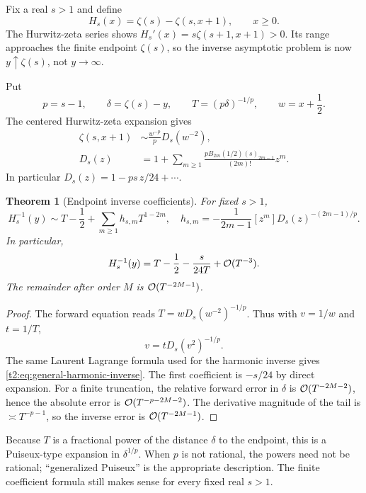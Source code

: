\documentclass[11pt,openany]{book}
\numberwithin{equation}{chapter}
\theoremstyle{plain}
\newtheorem{theorem}{Theorem}[chapter]
\theoremstyle{definition}
\theoremstyle{remark}
\newcommand{\rising}[2]{(#1)_{#2}}
\begin{document}
Fix a real $s>1$ and define
\begin{equation}
 H_s(x)=\zeta(s)-\zeta(s,x+1),\qquad x\ge0.
 \label{t2:eq:general-harmonic}
\end{equation}
The Hurwitz-zeta series shows
$H_s'(x)=s\zeta(s+1,x+1)>0$. Its range approaches the finite endpoint $\zeta(s)$, so the inverse asymptotic problem is now $y\uparrow\zeta(s)$, not $y\to\infty$.

Put
\begin{equation}
 p=s-1,\qquad \delta=\zeta(s)-y,\qquad
 T=(p\delta)^{-1/p},\qquad w=x+\frac12.
 \label{t2:eq:general-harmonic-core}
\end{equation}
The centered Hurwitz-zeta expansion \cite{dlmfhurwitz} gives
\begin{align}
 \zeta(s,x+1)&\sim\frac{w^{-p}}pD_s(w^{-2}),\nonumber\\
 D_s(z)&=1+\sum_{m\ge1}
  \frac{pB_{2m}(1/2)\rising{s}{2m-1}}{(2m)!}z^m.
 \label{t2:eq:general-harmonic-D}
\end{align}
In particular $D_s(z)=1-ps\,z/24+\cdots$.

\begin{theorem}[Endpoint inverse coefficients]
\label{t2:thm:general-harmonic-inverse}
For fixed $s>1$,
\begin{equation}
 H_s^{-1}(y)\sim T-\frac12+\sum_{m\ge1}h_{s,m}T^{1-2m},
 \quad
 h_{s,m}=-\frac1{2m-1}[z^m]
                    D_s(z)^{-(2m-1)/p}.
 \label{t2:eq:general-harmonic-inverse}
\end{equation}
In particular,
\begin{equation}
 H_s^{-1}(y)=T-\frac12-\frac{s}{24T}+\mathcal O(T^{-3}).
 \label{t2:eq:general-harmonic-first}
\end{equation}
The remainder after order $M$ is $\mathcal O(T^{-2M-1})$.
\end{theorem}
\begin{proof}
The forward equation reads $T=wD_s(w^{-2})^{-1/p}$. Thus with $v=1/w$ and $t=1/T$,
\[
 v=tD_s(v^2)^{-1/p}.
\]
The same Laurent Lagrange formula used for the harmonic inverse gives \eqref{t2:eq:general-harmonic-inverse}. The first coefficient is $-s/24$ by direct expansion. For a finite truncation, the relative forward error in $\delta$ is $\mathcal O(T^{-2M-2})$, hence the absolute error is $\mathcal O(T^{-p-2M-2})$. The derivative magnitude of the tail is $\asymp T^{-p-1}$, so the inverse error is $\mathcal O(T^{-2M-1})$.
\end{proof}

Because $T$ is a fractional power of the distance $\delta$ to the endpoint, this is a Puiseux-type expansion in $\delta^{1/p}$. When $p$ is not rational, the powers need not be rational; ``generalized Puiseux'' is the appropriate description. The finite coefficient formula still makes sense for every fixed real $s>1$.
\end{document}
